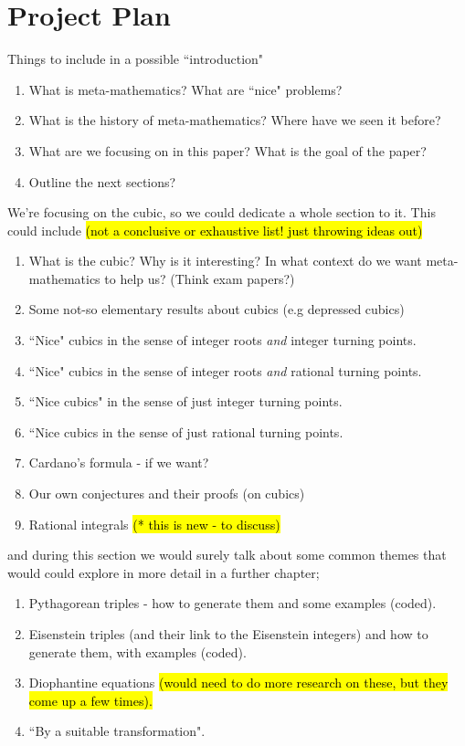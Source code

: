 \documentclass[12pt]{article}
\begin{document}
\section{Project Plan}
Things to include in a possible ``introduction"
\begin{enumerate}[itemsep=-2mm]
    \item What is meta-mathematics? What are ``nice" problems?
    \item What is the history of meta-mathematics? Where have we seen it before? 
    \item What are we focusing on in this paper? What is the goal of the paper?
    \item Outline the next sections?
\end{enumerate}
We're focusing on the cubic, so we could dedicate a whole section to it. This could include \hl{(not a conclusive or exhaustive list! just throwing ideas out)}
\begin{enumerate}[itemsep=-2mm]
    \item What is the cubic? Why is it interesting? In what context do we want meta-mathematics to help us? (Think exam papers?)
    \item Some not-so elementary results about cubics (e.g depressed cubics)
    \item ``Nice" cubics in the sense of integer roots \textit{and} integer turning points.
    \item ``Nice" cubics in the sense of integer roots \textit{and} rational turning points.
    \item ``Nice cubics" in the sense of just integer turning points.
    \item ``Nice cubics in the sense of just rational turning points.
    \item Cardano's formula - if we want?
    \item Our own conjectures and their proofs (on cubics)
    \item Rational integrals \hl{(* this is new - to discuss)}
\end{enumerate}
and during this section we would surely talk about some common themes that would could explore in more detail in a further chapter;
\begin{enumerate}[itemsep=-2mm]
    \item Pythagorean triples - how to generate them and some examples (coded).
    \item Eisenstein triples (and their link to the Eisenstein integers) and how to generate them, with examples (coded).
    \item Diophantine equations \hl{(would need to do more research on these, but they come up a few times).}
    \item ``By a suitable transformation".
\end{enumerate}
\end{document}
